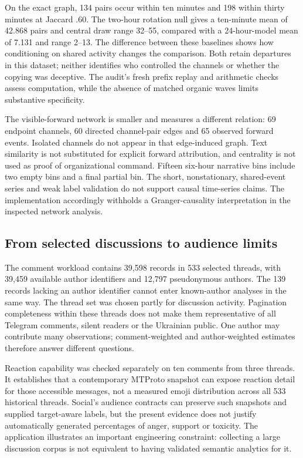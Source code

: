 On the exact graph, 134 pairs occur within ten minutes and 198 within thirty minutes at Jaccard .60. The two-hour rotation null gives a ten-minute mean of 42.868 pairs and central draw range 32--55, compared with a 24-hour-model mean of 7.131 and range 2--13. The difference between these baselines shows how conditioning on shared activity changes the comparison. Both retain departures in this dataset; neither identifies who controlled the channels or whether the copying was deceptive. The audit's fresh prefix replay and arithmetic checks assess computation, while the absence of matched organic waves limits substantive specificity.

The visible-forward network is smaller and measures a different relation: 69 endpoint channels, 60 directed channel-pair edges and 65 observed forward events. Isolated channels do not appear in that edge-induced graph. Text similarity is not substituted for explicit forward attribution, and centrality is not used as proof of organizational command. Fifteen six-hour narrative bins include two empty bins and a final partial bin. The short, nonstationary, shared-event series and weak label validation do not support causal time-series claims. The implementation accordingly withholds a Granger-causality interpretation in the inspected network analysis.

\subsection{From selected discussions to audience limits}
The comment workload contains 39,598 records in 533 selected threads, with 39,459 available author identifiers and 12,797 pseudonymous authors. The 139 records lacking an author identifier cannot enter known-author analyses in the same way. The thread set was chosen partly for discussion activity. Pagination completeness within these threads does not make them representative of all Telegram comments, silent readers or the Ukrainian public. One author may contribute many observations; comment-weighted and author-weighted estimates therefore answer different questions.

Reaction capability was checked separately on ten comments from three threads. It establishes that a contemporary MTProto snapshot can expose reaction detail for those accessible messages, not a measured emoji distribution across all 533 historical threads. Social's audience contracts can preserve such snapshots and supplied target-aware labels, but the present evidence does not justify automatically generated percentages of anger, support or toxicity. The application illustrates an important engineering constraint: collecting a large discussion corpus is not equivalent to having validated semantic analytics for it.

